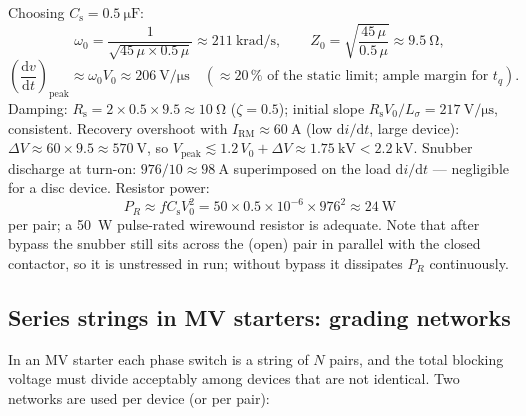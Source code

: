 \documentclass[11pt,a4paper]{article}
\begin{document}
Choosing $C_\mathrm{s} = \SI{0.5}{\micro\farad}$:
\begin{equation}
  \omega_0 = \frac{1}{\sqrt{45\,\mu \times 0.5\,\mu}}
  \approx \SI{211}{\kilo\radian\per\second}, \qquad
  Z_0 = \sqrt{\frac{45\,\mu}{0.5\,\mu}} \approx \SI{9.5}{\ohm},
\end{equation}
\begin{equation}
  \left(\frac{\mathrm{d}v}{\mathrm{d}t}\right)_\mathrm{peak}
  \approx \omega_0 V_0 \approx \SI{206}{\volt\per\micro\second}
  \quad (\approx 20\,\% \text{ of the static limit; ample margin for } t_q).
\end{equation}
Damping: $R_\mathrm{s} = 2 \times 0.5 \times 9.5 \approx \SI{10}{\ohm}$
($\zeta = 0.5$); initial slope $R_\mathrm{s}V_0/L_\sigma =
\SI{217}{\volt\per\micro\second}$, consistent. Recovery overshoot with
$I_\mathrm{RM} \approx \SI{60}{\ampere}$ (low
$\mathrm{d}i/\mathrm{d}t$, large device):
$\Delta V \approx 60 \times 9.5 \approx \SI{570}{\volt}$, so
$V_\mathrm{peak} \lesssim 1.2\,V_0 + \Delta V \approx \SI{1.75}{\kilo\volt}
< \SI{2.2}{\kilo\volt}$. Snubber discharge at turn-on:
$976/10 \approx \SI{98}{\ampere}$ superimposed on the load
$\mathrm{d}i/\mathrm{d}t$ --- negligible for a disc device. Resistor power:
\begin{equation}
  P_R \approx f C_\mathrm{s} V_0^2
  = 50 \times 0.5\times10^{-6} \times 976^2 \approx \SI{24}{\watt}
\end{equation}
per pair; a \SI{50}{\watt} pulse-rated wirewound resistor is adequate. Note
that after bypass the snubber still sits across the (open) pair in parallel
with the closed contactor, so it is unstressed in run; without bypass it
dissipates $P_R$ continuously.

\subsection{Series strings in MV starters: grading networks}

In an MV starter each phase switch is a string of $N$ pairs, and the total
blocking voltage must divide acceptably among devices that are not
identical. Two networks are used per device (or per pair):
\end{document}
